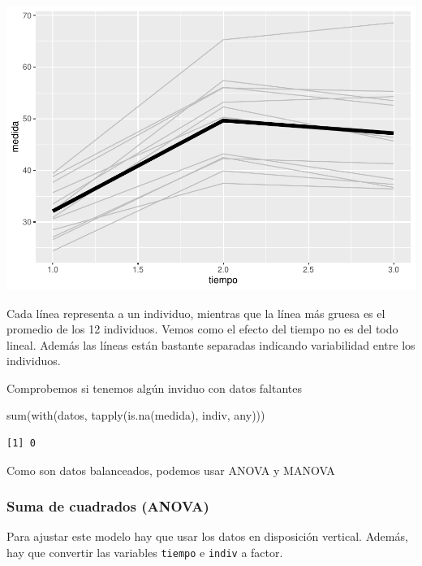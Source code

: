 \documentclass[
]{book}
\newenvironment{Shaded}{\begin{snugshade}}{\end{snugshade}}
\newcommand{\FunctionTok}[1]{\textcolor[rgb]{0.00,0.00,0.00}{#1}}
\newcommand{\NormalTok}[1]{#1}
\begin{document}
\includegraphics{fig_out/unnamed-chunk-48-1.pdf}

Cada línea representa a un individuo, mientras que la línea más gruesa es el promedio de los 12 individuos. Vemos como el efecto del tiempo no es del todo lineal. Además las líneas están bastante separadas indicando variabilidad entre los individuos.

Comprobemos si tenemos algún inviduo con datos faltantes

\begin{Shaded}
\begin{Highlighting}[]
\FunctionTok{sum}\NormalTok{(}\FunctionTok{with}\NormalTok{(datos, }\FunctionTok{tapply}\NormalTok{(}\FunctionTok{is.na}\NormalTok{(medida), indiv, any)))}
\end{Highlighting}
\end{Shaded}

\begin{verbatim}
[1] 0
\end{verbatim}

Como son datos balanceados, podemos usar ANOVA y MANOVA

\hypertarget{suma-de-cuadrados-anova}{%
\subsubsection{Suma de cuadrados (ANOVA)}\label{suma-de-cuadrados-anova}}

Para ajustar este modelo hay que usar los datos en disposición vertical.
Además, hay que convertir las variables \texttt{tiempo} e \texttt{indiv} a factor.
\end{document}
